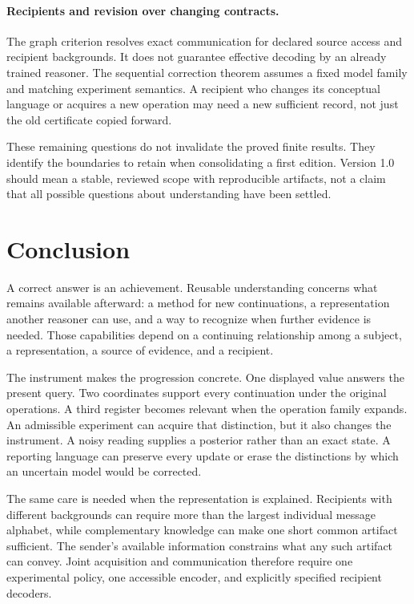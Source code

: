 \documentclass[11pt,letterpaper]{article}
\theoremstyle{plain}
\theoremstyle{definition}
\begin{document}
\paragraph{Recipients and revision over changing contracts.}
The graph criterion resolves exact communication for declared source access and recipient backgrounds. It does not guarantee effective decoding by an already trained reasoner. The sequential correction theorem assumes a fixed model family and matching experiment semantics. A recipient who changes its conceptual language or acquires a new operation may need a new sufficient record, not just the old certificate copied forward.

These remaining questions do not invalidate the proved finite results. They identify the boundaries to retain when consolidating a first edition. Version 1.0 should mean a stable, reviewed scope with reproducible artifacts, not a claim that all possible questions about understanding have been settled.

\section{Conclusion}\label{sec:conclusion}
A correct answer is an achievement. Reusable understanding concerns what remains available afterward: a method for new continuations, a representation another reasoner can use, and a way to recognize when further evidence is needed. Those capabilities depend on a continuing relationship among a subject, a representation, a source of evidence, and a recipient.

The instrument makes the progression concrete. One displayed value answers the present query. Two coordinates support every continuation under the original operations. A third register becomes relevant when the operation family expands. An admissible experiment can acquire that distinction, but it also changes the instrument. A noisy reading supplies a posterior rather than an exact state. A reporting language can preserve every update or erase the distinctions by which an uncertain model would be corrected.

The same care is needed when the representation is explained. Recipients with different backgrounds can require more than the largest individual message alphabet, while complementary knowledge can make one short common artifact sufficient. The sender's available information constrains what any such artifact can convey. Joint acquisition and communication therefore require one experimental policy, one accessible encoder, and explicitly specified recipient decoders.
\end{document}
